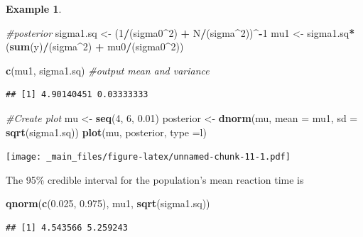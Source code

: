 \documentclass[
]{book}
\newenvironment{Shaded}{\begin{snugshade}}{\end{snugshade}}
\newcommand{\AttributeTok}[1]{\textcolor[rgb]{0.13,0.29,0.53}{#1}}
\newcommand{\CommentTok}[1]{\textcolor[rgb]{0.56,0.35,0.01}{\textit{#1}}}
\newcommand{\DecValTok}[1]{\textcolor[rgb]{0.00,0.00,0.81}{#1}}
\newcommand{\FloatTok}[1]{\textcolor[rgb]{0.00,0.00,0.81}{#1}}
\newcommand{\FunctionTok}[1]{\textcolor[rgb]{0.13,0.29,0.53}{\textbf{#1}}}
\newcommand{\NormalTok}[1]{#1}
\newcommand{\OtherTok}[1]{\textcolor[rgb]{0.56,0.35,0.01}{#1}}
\newcommand{\SpecialCharTok}[1]{\textcolor[rgb]{0.81,0.36,0.00}{\textbf{#1}}}
\newcommand{\StringTok}[1]{\textcolor[rgb]{0.31,0.60,0.02}{#1}}
\theoremstyle{definition}
\theoremstyle{definition}
\newtheorem{example}{Example}[chapter]
\theoremstyle{definition}
\theoremstyle{definition}
\theoremstyle{remark}
\begin{document}
\begin{example}
\begin{Shaded}
\begin{Highlighting}[]
\CommentTok{\#posterior}
\NormalTok{sigma1.sq }\OtherTok{\textless{}{-}}\NormalTok{ (}\DecValTok{1}\SpecialCharTok{/}\NormalTok{(sigma0}\SpecialCharTok{\^{}}\DecValTok{2}\NormalTok{)  }\SpecialCharTok{+}\NormalTok{ N}\SpecialCharTok{/}\NormalTok{(sigma}\SpecialCharTok{\^{}}\DecValTok{2}\NormalTok{))}\SpecialCharTok{\^{}{-}}\DecValTok{1}
\NormalTok{mu1       }\OtherTok{\textless{}{-}}\NormalTok{ sigma1.sq}\SpecialCharTok{*}\NormalTok{(}\FunctionTok{sum}\NormalTok{(y)}\SpecialCharTok{/}\NormalTok{(sigma}\SpecialCharTok{\^{}}\DecValTok{2}\NormalTok{) }\SpecialCharTok{+}\NormalTok{ mu0}\SpecialCharTok{/}\NormalTok{(sigma0}\SpecialCharTok{\^{}}\DecValTok{2}\NormalTok{))}

\FunctionTok{c}\NormalTok{(mu1, sigma1.sq) }\CommentTok{\#output mean and variance}
\end{Highlighting}
\end{Shaded}

\begin{verbatim}
## [1] 4.90140451 0.03333333
\end{verbatim}

\begin{Shaded}
\begin{Highlighting}[]
\CommentTok{\#Create plot}
\NormalTok{mu }\OtherTok{\textless{}{-}} \FunctionTok{seq}\NormalTok{(}\DecValTok{4}\NormalTok{, }\DecValTok{6}\NormalTok{, }\FloatTok{0.01}\NormalTok{)}
\NormalTok{posterior }\OtherTok{\textless{}{-}} \FunctionTok{dnorm}\NormalTok{(mu, }\AttributeTok{mean =}\NormalTok{ mu1, }\AttributeTok{sd =} \FunctionTok{sqrt}\NormalTok{(sigma1.sq))}
\FunctionTok{plot}\NormalTok{(mu, posterior, }\AttributeTok{type =}\StringTok{\textquotesingle{}l\textquotesingle{}}\NormalTok{)}
\end{Highlighting}
\end{Shaded}

\texttt{[image: \_main\_files/figure-latex/unnamed-chunk-11-1.pdf]}

The 95\% credible interval for the population's mean reaction time is

\begin{Shaded}
\begin{Highlighting}[]
\FunctionTok{qnorm}\NormalTok{(}\FunctionTok{c}\NormalTok{(}\FloatTok{0.025}\NormalTok{, }\FloatTok{0.975}\NormalTok{), mu1, }\FunctionTok{sqrt}\NormalTok{(sigma1.sq))}
\end{Highlighting}
\end{Shaded}

\begin{verbatim}
## [1] 4.543566 5.259243
\end{verbatim}

\end{example}
\end{document}
